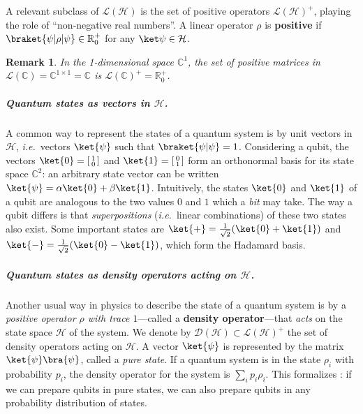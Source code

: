 \documentclass[10pt,a4paper]{article}
\newcommand*{\ie}{\emph{i.e.}\xspace}
\newcommand*{\definitive}[1]{\textbf{#1}}
\newcommand{\Real}{\mathbb{R}}
\newcommand{\nnReal}{\Real^+_0}
\renewcommand{\L}{\mathcal{L}}
\newcommand{\Pos}[1]{{\L(#1)}^+}
\newcommand{\D}{\mathcal{D}}
\newcommand*{\C}{\mathbb{C}}
\newcommand{\HH}{\mathcal{H}}
\newcommand{\M}{\rho}
\newtheorem{remark}[theorem]{Remark}
\begin{document}
A relevant subclass of $\L(\HH)$ is the set of positive operators $\Pos{\HH}$, playing the role of ``non‑negative real numbers''.
A linear operator $\M$ is \textbf{positive} %
if $\braket{\psi | \M | \psi} \in \nnReal$ for any $\ket \psi \in \HH$.

\begin{remark}
\label{rem:pos}
In the 1-dimensional space $\C^1$, the set of positive matrices in $\L(\C)=\C^{1\times 1}=\C$ is $\Pos{\C}=\nnReal$.
\end{remark}

\subparagraph{Quantum states as vectors in $\HH$.}

A common way to represent the states of a quantum system is by unit vectors in $\HH$, \ie\ vectors $\ket{\psi}$ such that $\braket{\psi | \psi} = 1$.
Considering a qubit, the vectors $\ket{0} = \left[\begin{smallmatrix}1\\0\end{smallmatrix}\right]$ and $\ket{1} = \left[\begin{smallmatrix}0\\1\end{smallmatrix}\right]$ form an orthonormal basis for its state space $\C^2$: an arbitrary state vector can be written $\ket{\psi} = \alpha \ket{0} + \beta \ket{1}$.
Intuitively, the states $\ket{0}$ and $\ket{1}$ of a qubit are analogous to the two values $0$ and $1$ which a \emph{bit} may take.
The way a qubit differs is that \emph{superpositions} (\ie\ linear combinations) of these two states also exist.
Some important states are $\ket{+} = \frac{1}{\sqrt{2}}(\ket{0} + \ket{1})$ and $\ket{-} = \frac{1}{\sqrt{2}}(\ket{0} - \ket{1})$, which form the Hadamard basis.

\subparagraph{Quantum states as density operators acting on $\HH$.}

Another usual way in physics to describe the state of a quantum system is by a \emph{positive operator $\rho$ with trace $1$}---called a \definitive{density operator}---that \emph{acts} on the state space $\HH$ of the system.
We denote by $\D(\HH) \subset \Pos{\HH}$ the set of density operators acting on $\HH$.
A vector $\ket{\psi}$ is represented by the matrix $\ket{\psi}\bra{\psi}$, called a \emph{pure state}.
If a quantum system is in the state $\rho_{i}$ with probability $p_i$, the density operator for the system is $\sum_{i} p_{i} \rho_{i}$.
This formalizes : if we can prepare qubits in pure states, we can also prepare qubits in any probability distribution of states.
\end{document}
